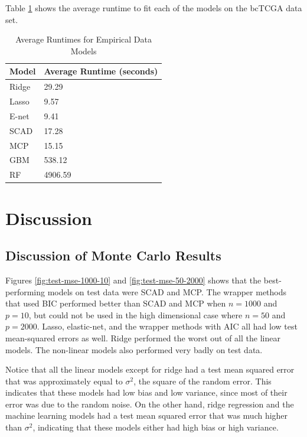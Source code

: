 \documentclass{article}
\begin{document}
Table \ref{tab:emp_runtimes} shows the average runtime to fit each of the models on the bcTCGA data set.

\begin{table}[h!]
	\centering
	\caption{Average Runtimes for Empirical Data Models}
	\label{tab:emp_runtimes}
	\begin{tabular}{ll}
		\hline
		\textbf{Model}        & \textbf{Average Runtime} (seconds) \\ \hline
		Ridge         & 29.29               \\
		Lasso         & 9.57                \\
		E-net	      & 9.41                \\
		SCAD          & 17.28               \\
		MCP           & 15.15               \\
		GBM      	  & 538.12              \\
		RF 			  & 4906.59             \\ \hline
	\end{tabular}
\end{table}

\newpage
\section{Discussion}\label{sec:discussion}
\subsection{Discussion of Monte Carlo Results}
Figures \ref{fig:test-mse-1000-10} and \ref{fig:test-mse-50-2000} shows that the best-performing models on test data were SCAD and MCP. The wrapper methods that used BIC performed better than SCAD and MCP when $n = 1000$ and $p = 10$, but could not be used in the high dimensional case where $n = 50$ and $p = 2000$. Lasso, elastic-net, and the wrapper methods with AIC all had low test mean-squared errors as well. Ridge performed the worst out of all the linear models. The non-linear models also performed very badly on test data.

Notice that all the linear models except for ridge had a test mean squared error that was approximately equal to $\sigma^2$, the square of the random error. This indicates that these models had low bias and low variance, since most of their error was due to the random noise. On the other hand, ridge regression and the machine learning models had a test mean squared error that was much higher than $\sigma^2$, indicating that these models either had high bias or high variance.
\end{document}
